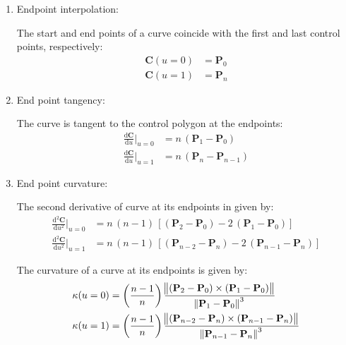 \begin{enumerate}
    \item Endpoint interpolation:
    
    The start and end points of a \Bezier curve coincide with the first and last control points, respectively:
    \begin{align*}
        \mathbf{C}(u=0) &= \mathbf{P}_{0} \\
        \mathbf{C}(u=1) &= \mathbf{P}_{n}
    \end{align*}
    
    \item End point tangency:
    
    The \Bezier curve is tangent to the control polygon at the endpoints:
    \begin{align*}
        \frac{\mathrm{d}\mathbf{C}}{\mathrm{d}u}\Bigr|_{u=0} &= n\,(\mathbf{P}_{1} - \mathbf{P}_{0}) \\
        \frac{\mathrm{d}\mathbf{C}}{\mathrm{d}u}\Bigr|_{u=1} &= n\,(\mathbf{P}_{n} - \mathbf{P}_{n-1})
    \end{align*}
    
    \item End point curvature:
    
    The second derivative of \Bezier curve at its endpoints in given by:
    \begin{align*}
        \frac{\mathrm{d}^2\mathbf{C}}{\mathrm{d}u^2}\Bigr|_{u=0} &= n\,(n-1) \, \left[ (\mathbf{P}_{2}-\mathbf{P}_{0})  - 2 \, ( \mathbf{P}_{1} - \mathbf{P}_{0}) \right] \\
        \frac{\mathrm{d}^2\mathbf{C}}{\mathrm{d}u^2}\Bigr|_{u=1} &= n\,(n-1) \, \left[ (\mathbf{P}_{n-2}-\mathbf{P}_{n})  - 2 \, ( \mathbf{P}_{n-1} - \mathbf{P}_{n}) \right]
    \end{align*}
    
    The curvature of a \Bezier curve at its endpoints is given by:
    \begin{align*}
        \kappa(u=0) &=  \left( \frac{n-1}{n}  \right)
        \frac{\norm{ \left(\mathbf{P}_{2}-\mathbf{P}_{0}\right) \times \left(\mathbf{P}_{1}-\mathbf{P}_{0}\right)} }{\norm{\mathbf{P}_{1}-\mathbf{P}_{0}}^3} \\
        \kappa(u=1) &=  \left( \frac{n-1}{n}  \right) 
        \frac{\norm{ \left(\mathbf{P}_{n-2}-\mathbf{P}_{n}\right) \times \left(\mathbf{P}_{n-1}-\mathbf{P}_{n}\right)} }{\norm{\mathbf{P}_{n-1}-\mathbf{P}_{n}}^3}
    \end{align*}
    
\end{enumerate}



